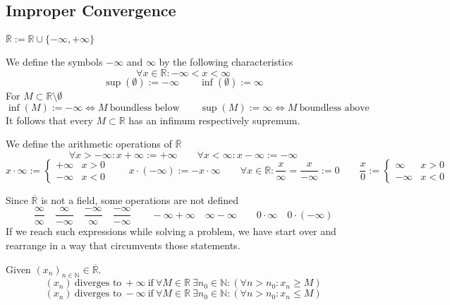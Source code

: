 \subsection{Improper Convergence}
\begin{definition}
   \(\overline{\mathbb{R}} := \mathbb{R} \cup \{-\infty, +\infty\}\)
\end{definition}
\begin{remark}
   We define the symbols \(-\infty\) and \(\infty\) by the following characteristics
   \[\forall x \in \mathbb{R}: -\infty < x < \infty\]
   \[\sup(\emptyset) := -\infty \qquad \inf(\emptyset) := \infty\]
   For \(M \subset \mathbb{R}\setminus \emptyset\)
   \[\inf(M) := -\infty \iff M~\text{boundless below} \qquad \sup(M) := \infty \iff M~\text{boundless above}\]
   It follows that every \(M \subset \mathbb{R}\) has an infimum respectively supremum.

   We define the arithmetic operations of \(\overline{\mathbb{R}}\)
   \[\forall x > -\infty: x + \infty := +\infty \qquad \forall x < \infty: x - \infty := -\infty\]
   \[x \cdot \infty := \begin{cases}+\infty & x > 0\\ -\infty & x < 0\end{cases} \qquad x \cdot (-\infty) := -x \cdot \infty \qquad \forall x \in \mathbb{R}: \frac{x}{\infty} = \frac{x}{-\infty} := 0 \qquad \frac{x}{0} := \begin{cases}\infty & x > 0\\-\infty & x < 0\end{cases}\]
\end{remark}

\begin{remark}
   Since \(\overline{\mathbb{R}}\) is not a field, some operations are not defined
   \[\frac{\infty}{\infty} \quad \frac{\infty}{-\infty} \quad \frac{-\infty}{\infty} \quad \frac{-\infty}{-\infty} \qquad -\infty + \infty \quad \infty - \infty \qquad 0 \cdot \infty \quad 0 \cdot (-\infty)\]
   If we reach such expressions while solving a problem, we have start over and rearrange in a way that circumvents those statements.
\end{remark}

\begin{definition}
   Given \((x_n)_{n \in \mathbb{N}} \in \overline{\mathbb{R}}\).
   \[(x_n)~\text{diverges to}~+\infty~\text{if}~\forall M \in \mathbb{R}~\exists n_0 \in \mathbb{N}: (\forall n > n_0: x_n \geq M)\]
   \[(x_n)~\text{diverges to}~-\infty~\text{if}~\forall M \in \mathbb{R}~\exists n_0 \in \mathbb{N}: (\forall n > n_0: x_n \leq M)\]
\end{definition}

